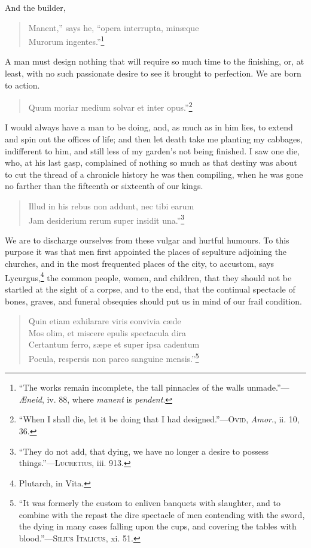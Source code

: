 \noindent And the builder,

\begin{verse}
Manent,'' says he, ``opera interrupta, min\ae que\\
Murorum ingentes.''\footnote{``The works remain incomplete, the tall
pinnacles of the walls unmade.''---\textit{\AE neid}, iv. 88, where
\textit{manent} is \textit{pendent}.}
\end{verse}

\noindent A man must design nothing that will require so much time to
the finishing, or, at least, with no such passionate desire to see it
brought to perfection. We are born to action.

\begin{verse}
Quum moriar medium solvar et inter opus.''\footnote{``When I
shall die, let it be doing that I had designed.''---\textsc{Ovid},
\textit{Amor}., ii. 10, 36.}
\end{verse}

\noindent I would always have a man to be doing, and, as much as in
him lies, to extend and spin out the offices of life; and then let
death take me planting my cabbages, indifferent to him, and still less
of my garden's not being finished. I saw one die, who, at his last
gasp, complained of nothing so much as that destiny was about to cut
the thread of a chronicle  history he was then compiling,
when he was gone no farther than the fifteenth or sixteenth of our
kings.

\begin{verse}
Illud in his rebus non addunt, nec tibi earum\\
Jam desiderium rerum super insidit una.''\footnote{``They do not add,
that dying, we have no longer a desire to possess
things.''---\textsc{Lucretius}, iii. 913.}
\end{verse}

\noindent We are to discharge ourselves from these vulgar and hurtful
humours. To this purpose it was that men first appointed the places of
sepulture adjoining the churches, and in the most frequented places of
the city, to accustom, says Lycurgus,\footnote{Plutarch, in Vita.} the
common people, women, and children, that they should not be startled
at the sight of a corpse, and to the end, that the continual spectacle
of bones, graves, and funeral obsequies should put us in mind of our
frail condition.

\begin{verse}
Quin etiam exhilarare viris eonvivia c\ae de\\
Mos olim, et miscere epulis spectacula dira\\
Certantum ferro, s\ae pe et super ipsa cadentum\\
Pocula, respersis non parco sanguine mensis.''\footnote{``It was
formerly the custom to enliven banquets with slaughter, and to combine
with the repast the dire spectacle of men contending with the sword,
the dying in many cases falling upon the cups, and covering the tables
with blood.''---\textsc{Silius Italicus}, xi. 51.}
\end{verse}

